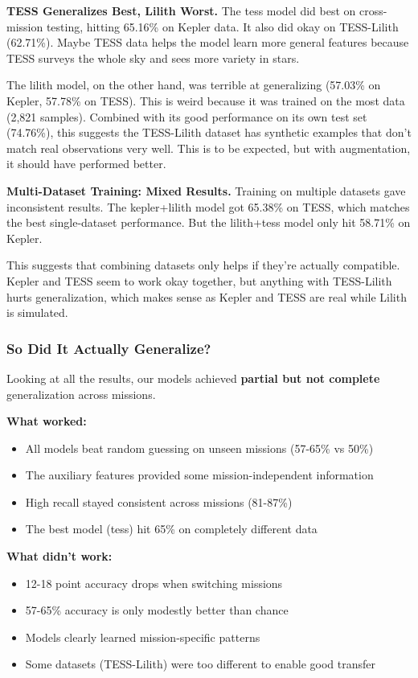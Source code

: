 \documentclass[letterpaper]{article} %
\begin{document}
\textbf{TESS Generalizes Best, Lilith Worst.} The tess model did best on cross-mission testing, hitting 65.16\% on Kepler data. It also did okay on TESS-Lilith (62.71\%). Maybe TESS data helps the model learn more general features because TESS surveys the whole sky and sees more variety in stars.

The lilith model, on the other hand, was terrible at generalizing (57.03\% on Kepler, 57.78\% on TESS). This is weird because it was trained on the most data (2,821 samples). Combined with its good performance on its own test set (74.76\%), this suggests the TESS-Lilith dataset has synthetic examples that don't match real observations very well. This is to be expected, but with augmentation, it should have performed better.

\textbf{Multi-Dataset Training: Mixed Results.} Training on multiple datasets gave inconsistent results. The kepler+lilith model got 65.38\% on TESS, which matches the best single-dataset performance. But the lilith+tess model only hit 58.71\% on Kepler.

This suggests that combining datasets only helps if they're actually compatible. Kepler and TESS seem to work okay together, but anything with TESS-Lilith hurts generalization, which makes sense as Kepler and TESS are real while Lilith is simulated.

\subsubsection{So Did It Actually Generalize?}

Looking at all the results, our models achieved \textbf{partial but not complete} generalization across missions.

\textbf{What worked:}
\begin{itemize}
    \item All models beat random guessing on unseen missions (57-65\% vs 50\%)
    \item The auxiliary features provided some mission-independent information
    \item High recall stayed consistent across missions (81-87\%)
    \item The best model (tess) hit 65\% on completely different data
\end{itemize}

\textbf{What didn't work:}
\begin{itemize}
    \item 12-18 point accuracy drops when switching missions
    \item 57-65\% accuracy is only modestly better than chance
    \item Models clearly learned mission-specific patterns
    \item Some datasets (TESS-Lilith) were too different to enable good transfer
\end{itemize}
\end{document}
